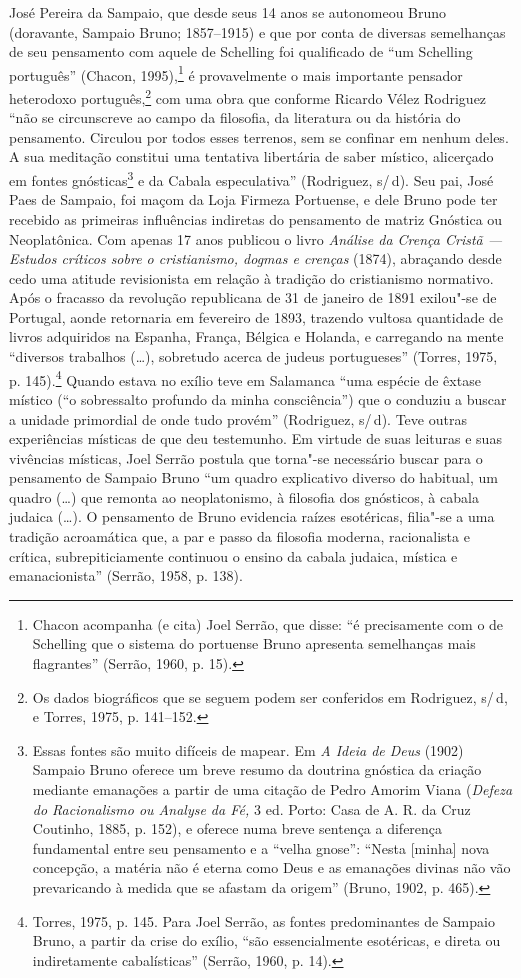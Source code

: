 José Pereira da Sampaio, que desde seus 14 anos se autonomeou
Bruno (doravante, Sampaio Bruno;
1857--1915) e que por conta de
diversas semelhanças de seu pensamento com aquele de Schelling
foi qualificado de “um Schelling português” (Chacon,
1995),\footnote{ Chacon acompanha (e cita) Joel Serrão, que
disse: “é precisamente com o de Schelling que o sistema do
portuense Bruno apresenta semelhanças mais flagrantes” (Serrão,
1960, p. 15).} é provavelmente o mais importante pensador
heterodoxo português,\footnote{ Os dados biográficos que se
seguem podem ser conferidos em Rodriguez, s/\,d, e Torres, 1975,
p. 141--152.} com uma obra que conforme Ricardo Vélez Rodriguez
“não se circunscreve ao campo da filosofia, da literatura ou da
história do pensamento. Circulou por todos esses terrenos, sem
se confinar em nenhum deles. A sua meditação constitui uma
tentativa libertária de saber místico, alicerçado em fontes
gnósticas\footnote{ Essas fontes são muito difíceis de mapear.
Em \emph{A Ideia de Deus} (1902) Sampaio Bruno oferece um
breve resumo da doutrina gnóstica da criação mediante emanações
a partir de uma citação de Pedro Amorim Viana (\textit{Defeza do
Racionalismo ou Analyse da Fé,} 3 ed. Porto: Casa de A. R. da
Cruz Coutinho, 1885, p. 152), e oferece numa breve sentença a
diferença fundamental entre seu pensamento e a “velha gnose”:
“Nesta [minha] nova concepção, a matéria não é eterna como Deus
e as emanações divinas não vão prevaricando à medida que se
afastam da origem” (Bruno, 1902, p. 465).} e da Cabala
especulativa” (Rodriguez, s/\,d). Seu pai, José Paes de Sampaio,
foi maçom da Loja Firmeza Portuense, e dele Bruno pode ter
recebido as primeiras influências indiretas do pensamento de
matriz Gnóstica ou Neoplatônica. Com apenas 17 anos publicou o
livro \emph{Análise da Crença Cristã --- Estudos críticos sobre
o cristianismo, dogmas e crenças} (1874), abraçando desde cedo
uma atitude revisionista em relação à tradição do cristianismo
normativo. Após o fracasso da revolução republicana de 31 de
janeiro de 1891 exilou"-se de Portugal, aonde retornaria em
fevereiro de 1893, trazendo vultosa quantidade de livros
adquiridos na Espanha, França, Bélgica e Holanda, e carregando
na mente “diversos trabalhos (\ldots{}), sobretudo acerca de judeus
portugueses” (Torres, 1975, p. 145).\footnote{ Torres, 1975, p.
145. Para Joel Serrão, as fontes predominantes de Sampaio Bruno,
a partir da crise do exílio, “são essencialmente esotéricas, e
direta ou indiretamente cabalísticas” (Serrão, 1960, p. 14).}
Quando estava no exílio teve em Salamanca “uma espécie de êxtase
místico (``o sobressalto profundo da minha consciência'') que o
conduziu a buscar a unidade primordial de onde tudo provém”
(Rodriguez, s/\,d). Teve outras experiências místicas de que deu
testemunho. Em virtude de suas leituras e suas vivências
místicas, Joel Serrão postula que torna"-se necessário buscar
para o pensamento de Sampaio Bruno “um quadro explicativo
diverso do habitual, um quadro (\ldots{}) que remonta ao
neoplatonismo, à filosofia dos gnósticos, à cabala judaica
(\ldots{}). O pensamento de Bruno evidencia raízes esotéricas,
filia"-se a uma tradição acroamática que, a par e passo da
filosofia moderna, racionalista e crítica, subrepiticiamente
continuou o ensino da cabala judaica, mística e emanacionista”
(Serrão, 1958, p. 138).

